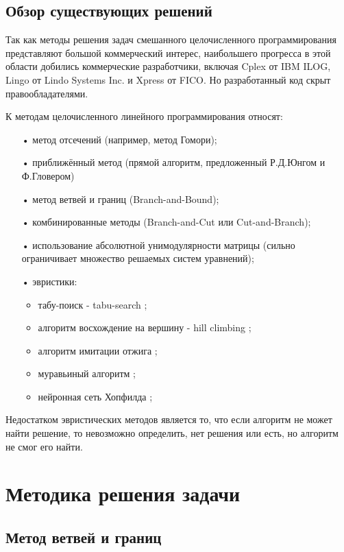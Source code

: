 \documentclass[a4paper,14pt,russian]{extreport}
\begin{document}
\section{Обзор существующих решений}

Так как методы решения задач смешанного целочисленного программирования представляют большой коммерческий интерес, наибольшего прогресса в этой области добились коммерческие разработчики, включая Cplex от IBM ILOG, Lingo от Lindo Systems Inc. и Xpress от FICO. Но разработанный код скрыт правообладателями. 
\par К методам целочисленного линейного программирования относят:
  \begin{itemize}
  \item[•] метод отсечений (например, метод Гомори);
  \item[•] приближённый метод (прямой алгоритм, предложенный Р.Д.Юнгом и Ф.Гловером)
  \item[•] метод ветвей и границ (Branch-and-Bound);
  \item[•] комбинированные методы (Branch-and-Cut или Cut-and-Branch);
  \item[•] использование абсолютной унимодулярности матрицы (сильно ограничивает множество решаемых систем уравнений);
  \item[•] эвристики:
    \begin{itemize}
    \item табу-поиск - tabu-search \cite{glover};
    \item алгоритм восхождение на вершину - hill climbing \cite{russell};
    \item алгоритм имитации отжига \cite{kirkpatrick};
    \item муравьиный алгоритм \cite{colorni};
    \item нейронная сеть Хопфилда \cite{lau};
    \end{itemize}
  \end{itemize}
\par Недостатком эвристических методов является то, что если алгоритм не может найти решение, то невозможно определить, нет решения или есть, но алгоритм не смог его найти. 


\chapter{Методика решения задачи}

\section{Метод ветвей и границ}
\end{document}
